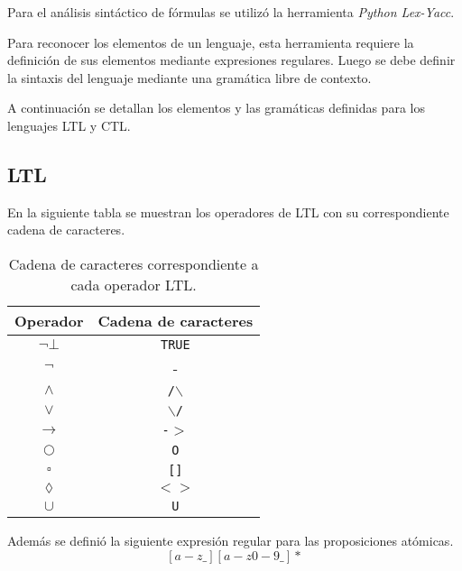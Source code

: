 Para el análisis sintáctico de fórmulas se utilizó la herramienta \textit{Python Lex-Yacc}.

Para reconocer los elementos de un lenguaje, esta herramienta requiere la definición de
 sus elementos mediante expresiones regulares.
Luego se debe definir la sintaxis del lenguaje mediante una gramática libre de contexto.

A continuación se detallan los elementos y las gramáticas definidas para los lenguajes
 LTL y CTL.


\subsection{LTL}\label{cap:imp_ltl}
En la siguiente tabla se muestran los operadores de LTL con su correspondiente cadena de caracteres.

\begin{table}
\begin{center}
   \begin{tabular}{ | c | c | }
     \hline
     \textbf{Operador} & \textbf{Cadena de caracteres} \\ \hline
     $\lnot\bot$ & \texttt{TRUE} \\
     $\lnot$ & - \\
     $\land$ & \texttt{/$\backslash$} \\
     $\lor$ & \texttt{$\backslash$/} \\
     $\rightarrow$ & \texttt{-$>$} \\
     $\bigcirc$ & \texttt{O} \\
     $\square$ & \texttt{[]} \\
     $\lozenge$ & \texttt{$<>$} \\
     $\cup$ & \texttt{U} \\
     \hline
   \end{tabular}
\end{center}
\caption[Representación de operadores LTL]{Cadena de caracteres correspondiente a cada operador LTL.}
\end{table}

Además se definió la siguiente expresión regular para las proposiciones atómicas.
\[ [a-z\_ ][a-z0-9\_ ]* \]

